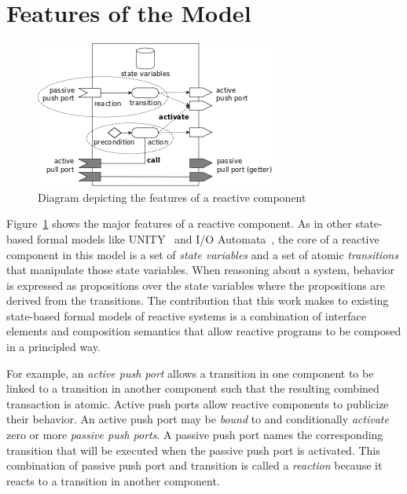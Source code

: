 \section{Features of the Model}


\begin{figure}[H]
\centering
\includegraphics{reactive_component.png}
\caption{Diagram depicting the features of a reactive component\label{reactive_component}}
\end{figure}

Figure~\ref{reactive_component} shows the major features of a reactive component.
As in other state-based formal models like UNITY~\cite{chandy1989parallel} and I/O Automata~\cite{nancy1996distributed}, the core of a reactive component in this model is a set of \emph{state variables} and a set of atomic \emph{transitions} that manipulate those state variables.
When reasoning about a system, behavior is expressed as propositions over the state variables where the propositions are derived from the transitions.
The contribution that this work makes to existing state-based formal models of reactive systems is a combination of interface elements and composition semantics that allow reactive programs to be composed in a principled way.

For example, an \emph{active push port} allows a transition in one component to be linked to a transition in another component such that the resulting combined transaction is atomic.
Active push ports allow reactive components to publicize their behavior.
An active push port may be \emph{bound} to and conditionally \emph{activate} zero or more \emph{passive push ports}.
A passive push port names the corresponding transition that will be executed when the passive push port is activated.
This combination of passive push port and transition is called a \emph{reaction} because it reacts to a transition in another component.

